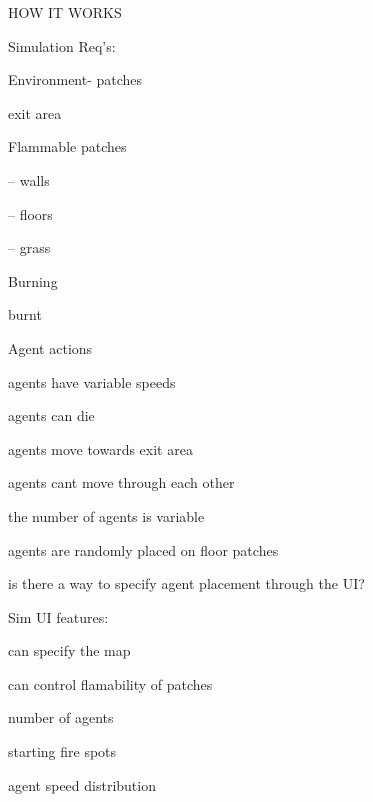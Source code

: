 \documentclass[12pt,letterpaper]{article}
\begin{document}
HOW IT WORKS

Simulation Req's:

Environment- patches

    exit area

    Flammable patches

-- walls

-- floors

-- grass

    Burning

    burnt

Agent actions

    agents have variable speeds

    agents can die

    agents move towards exit area

    agents cant move through each other

    the number of agents is variable

    agents are randomly placed on floor patches

    is there a way to specify agent placement through the UI?

Sim UI features:

    can specify the map

    can control flamability of patches

    number of agents

    starting fire spots

    agent speed distribution
\end{document}
